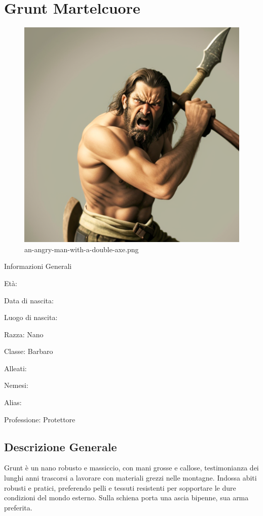 \section{Grunt Martelcuore}\label{grunt-martelcuore}


\begin{figure}
\centering
\includegraphics{an-angry-man-with-a-double-axe.png}
\caption{an-angry-man-with-a-double-axe.png}
\end{figure}

Informazioni Generali

Età:

Data di nascita:

Luogo di nascita:

Razza: Nano

Classe: Barbaro

Alleati:

Nemesi:

Alias:

Professione: Protettore


\subsection{Descrizione Generale}\label{descrizione-generale}


Grunt è un nano robusto e massiccio, con mani grosse e callose,
testimonianza dei lunghi anni trascorsi a lavorare con materiali grezzi
nelle montagne. Indossa abiti robusti e pratici, preferendo pelli e
tessuti resistenti per sopportare le dure condizioni del mondo esterno.
Sulla schiena porta una ascia bipenne, sua arma preferita.


